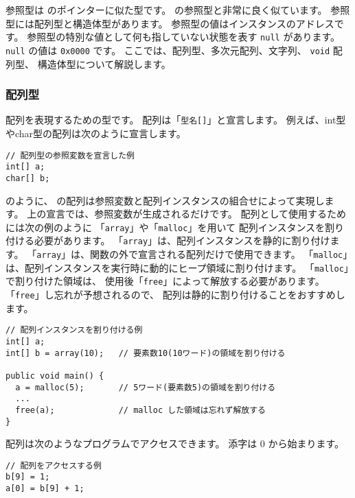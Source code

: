 参照型は \cl のポインターに似た型です。
\javal の参照型と非常に良く似ています。
参照型には配列型と構造体型があります。
参照型の値はインスタンスのアドレスです。
参照型の特別な値として何も指していない状態を表す \verb/null/ があります。
\verb/null/ の値は \verb/0x0000/ です。
ここでは、配列型、多次元配列、文字列、 \verb/void/ 配列型、
構造体型について解説します。

\subsubsection{配列型}
\label{chap3:array}
配列を表現するための型です。
配列は「\verb/型名[]/」と宣言します。
例えば、int型やchar型の配列は次のように宣言します。

\begin{mylist}
\begin{verbatim}
// 配列型の参照変数を宣言した例
int[] a;
char[] b;
\end{verbatim}
\end{mylist}


のように、
\cmml の配列は参照変数と配列インスタンスの組合せによって実現します。
上の宣言では、参照変数が生成されるだけです。
配列として使用するためには次の例のように
「\verb/array/」や「\verb/malloc/」を用いて
配列インスタンスを割り付ける必要があります。
「\verb/array/」は、配列インスタンスを静的に割り付けます。
「\verb/array/」は、関数の外で宣言される配列だけで使用できます。
「\verb/malloc/」は、配列インスタンスを実行時に動的にヒープ領域に割り付けます。
「\verb/malloc/」で割り付けた領域は、
使用後「\verb/free/」によって解放する必要があります。
「\verb/free/」し忘れが予想されるので、
配列は静的に割り付けることをおすすめします。

\begin{mylist}
\begin{verbatim}
// 配列インスタンスを割り付ける例
int[] a;
int[] b = array(10);   // 要素数10(10ワード)の領域を割り付ける

public void main() {
  a = malloc(5);       // 5ワード(要素数5)の領域を割り付ける
  ...
  free(a);             // malloc した領域は忘れず解放する
}
\end{verbatim}
\end{mylist}

配列は次のようなプログラムでアクセスできます。
添字は 0 から始まります。

\begin{mylist}
\begin{verbatim}
// 配列をアクセスする例
b[9] = 1;
a[0] = b[9] + 1;
\end{verbatim}
\end{mylist}


